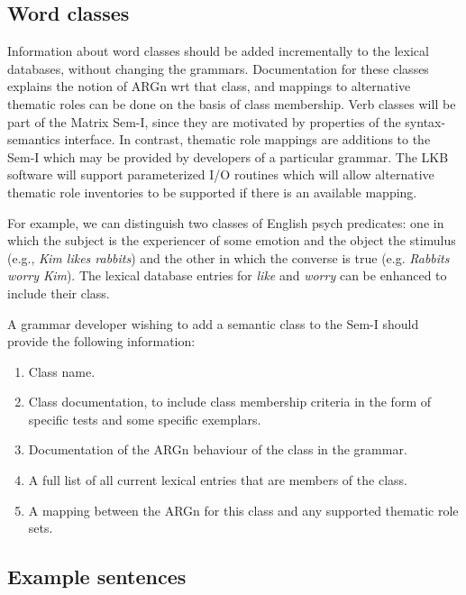 \documentclass[12pt]{article}
\begin{document}
\subsection{Word classes}

Information about word classes should be added
incrementally to the lexical databases, without changing the grammars.
Documentation for these classes explains the notion of ARGn wrt that class, and
mappings to alternative thematic roles can be done on the basis of class 
membership.
Verb classes will be part of the Matrix Sem-I, since they are motivated by 
properties of the syntax-semantics interface.  In contrast, thematic role 
mappings are additions to the Sem-I which may be provided by developers of
a particular grammar.  The LKB software will support parameterized I/O routines
which will allow alternative thematic
role inventories to be supported if there is an available mapping.

For example, we can distinguish two classes of
English psych predicates: one in which the subject is
the experiencer of some emotion and the object the stimulus
(e.g., {\it Kim likes rabbits}) and the other in which the converse is true
(e.g. {\it Rabbits worry Kim}).  The lexical database entries
for {\it like} and {\it worry} can be enhanced to include their class.

A grammar developer wishing to add a semantic class to the Sem-I
should provide the following information:
\begin{enumerate}
\item Class name.
\item Class documentation, to include 
class membership criteria in the form of specific tests
and some specific exemplars.
\item Documentation of the ARGn behaviour of the class in the grammar.
\item A full list of all current lexical entries that are members
of the class.
\item A mapping between the ARGn for this class and any supported
thematic role sets.
\end{enumerate}

\subsection{Example sentences}
\label{sempref}
\end{document}
